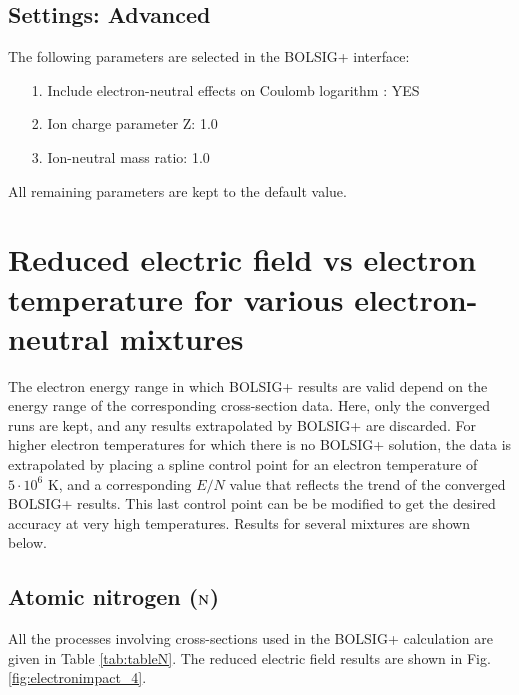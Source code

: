 \subsection{Settings: Advanced}

The following parameters are selected in the BOLSIG+ interface:

\begin{itemize}
\item[1.]{Include electron-neutral effects on Coulomb logarithm : YES}
\item[2.]{Ion charge parameter Z: 1.0}
\item[3.]{Ion-neutral mass ratio: 1.0}
\end{itemize}
All remaining parameters are kept to the default value.

\section{Reduced electric field vs electron temperature for various electron-neutral mixtures}

The electron energy range in which BOLSIG+ results are valid depend on the energy range of the corresponding cross-section data. Here, only the converged runs are kept, and any results extrapolated by BOLSIG+ are discarded. For higher electron temperatures for which there is no BOLSIG+ solution, the data is extrapolated by placing a spline control point for an electron temperature of $5\cdot10^6$ K, and a corresponding $E/N$ value that reflects the trend of the converged BOLSIG+ results. This last control point can be be modified to get the desired accuracy at very high temperatures. Results for several mixtures are shown below.

%
\subsection{Atomic nitrogen ($\rm N$)}

All the processes involving cross-sections used in the BOLSIG+ calculation are given in Table \ref{tab:tableN}. The reduced electric field results are shown in Fig. \ref{fig:electronimpact_4}.

